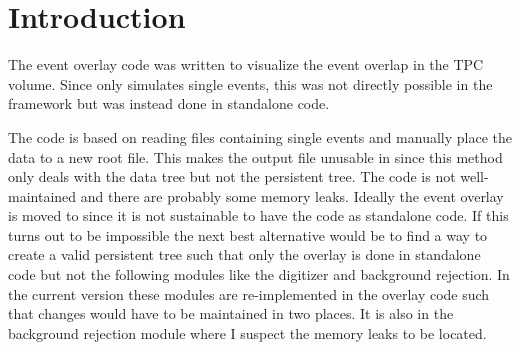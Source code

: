 \chapter{Introduction} 
The event overlay code was written to visualize the event overlap in the TPC volume. Since \btwo only simulates single events, this was not directly possible in the framework but was instead done in standalone code.

The code is based on reading files containing single events and manually place the data to a new root file. This makes the output file unusable in \btwo since this method only deals with the data tree but not the persistent tree. The code is not well-maintained and there are probably some memory leaks. Ideally the event overlay is moved to \btwo since it is not sustainable to have the code as standalone code. If this turns out to be impossible the next best alternative would be to find a way to create a valid persistent tree such that only the overlay is done in standalone code but not the following modules like the digitizer and background rejection. In the current version these modules are re-implemented in the overlay code such that changes would have to be maintained in two places. It is also in the background rejection module where I suspect the memory leaks to be located.

